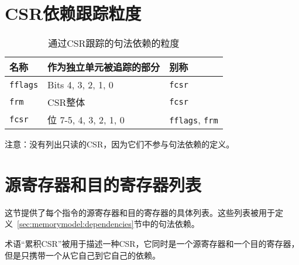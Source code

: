 \section{CSR依赖跟踪粒度}
\label{sec:csr-granularity}

\begin{table}[h!]
  \centering
  \begin{tabular}{|l|l|l|}
    \hline
    名称 & 作为独立单元被追踪的部分 & 别称  \\
    \hline
    {\tt fflags} & Bits 4, 3, 2, 1, 0 & {\tt fcsr}  \\
    \hline
    {\tt frm} & CSR整体 & {\tt fcsr} \\
    \hline
    {\tt fcsr} & 位 7-5, 4, 3, 2, 1, 0 & {\tt fflags}, {\tt frm} \\
    \hline
  \end{tabular}
  \caption{通过CSR跟踪的句法依赖的粒度
    }
\end{table}

注意：没有列出只读的CSR，因为它们不参与句法依赖的定义。

\section{源寄存器和目的寄存器列表}
\label{sec:source-dest-regs}

这节提供了每个指令的源寄存器和目的寄存器的具体列表。这些列表被用于定义~\ref{sec:memorymodel:dependencies}节中的句法依赖。

术语“累积CSR”被用于描述一种CSR，它同时是一个源寄存器和一个目的寄存器，但是只携带一个从它自己到它自己的依赖。

